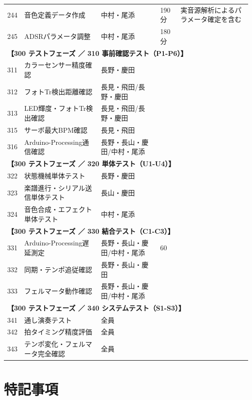 \begin{longtable}{p{0.9cm}p{7cm}p{2.5cm}p{2cm}p{2cm}}
244 & 音色定義データ作成 & 中村・尾添 & 190分 & 実音源解析によるパラメータ確定を含む \\
245 & ADSRパラメータ調整 & 中村・尾添 & 180分 &  \\
\midrule
\multicolumn{5}{l}{\textbf{【300 テストフェーズ ／ 310 事前確認テスト（P1-P6）】}} \\
\midrule
311 & カラーセンサー精度確認 & 長野・慶田 &  &  \\
312 & フォトTr検出距離確認 & 長見・飛田/長野・慶田 &  &  \\
313 & LED輝度・フォトTr検出確認 & 長見・飛田/長野・慶田 &  &  \\
315 & サーボ最大BPM確認 & 長見・飛田 &  &  \\
316 & Arduino-Processing通信確認 & 長野・長山・慶田/中村・尾添 &  &  \\
\midrule
\multicolumn{5}{l}{\textbf{【300 テストフェーズ ／ 320 単体テスト（U1-U4）】}} \\
\midrule
322 & 状態機械単体テスト & 長野・慶田 &  &  \\
323 & 楽譜進行・シリアル送信単体テスト & 長山・慶田 &  &  \\
324 & 音色合成・エフェクト単体テスト & 中村・尾添 &  &  \\
\midrule
\multicolumn{5}{l}{\textbf{【300 テストフェーズ ／ 330 結合テスト（C1-C3）】}} \\
\midrule
331 & Arduino-Processing遅延測定 & 長野・長山・慶田/中村・尾添 & 60 &  \\
332 & 同期・テンポ追従確認 & 長野・長山・慶田 &  &  \\
333 & フェルマータ動作確認 & 長野・長山・慶田/中村・尾添 &  &  \\
\midrule
\multicolumn{5}{l}{\textbf{【300 テストフェーズ ／ 340 システムテスト（S1-S3）】}} \\
\midrule
341 & 通し演奏テスト & 全員 &  &  \\
342 & 拍タイミング精度評価 & 全員 &  &  \\
343 & テンポ変化・フェルマータ完全確認 & 全員 &  &  \\
\midrule

\end{longtable}
\endgroup

\section{特記事項}

